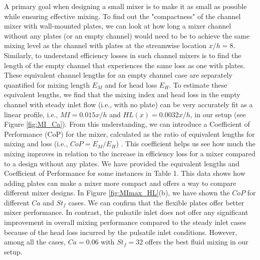 \documentclass[%
 aip,
 amsmath,amssymb,
 reprint,
]{revtex4-1}
\begin{document}
A primary goal when designing a small mixer is to make it as small as possible while ensuring effective mixing. To find out the "compactness" of the channel mixer with wall-mounted plates, we can look at how long a mixer channel without any plates (or an empty channel) would need to be to achieve the same mixing level as the channel with plates at the streamwise location $x/h = 8$. Similarly, to understand efficiency losses in such channel mixers is to find the length of the empty channel that experiences the same loss as one with plates. These equivalent channel lengths for an empty channel case are separately quantified for mixing length $E_M$ and for head loss $E_H$. To estimate these equivalent lengths, we find that the mixing index and head loss in the empty channel with steady inlet flow (i.e., with no plate) can be very accurately fit as a linear profile, i.e., $MI = 0.015x/h$ and $HL(x)=0.0032x/h$, in our setup (see Figure \ref{fig:MI_Ca}). From this understanding, we can introduce a Coefficient of Performance (CoP) for the mixer, calculated as the ratio of equivalent lengths for mixing and loss (i.e., $CoP = E_M/E_H$) \citep{Aaron2019}. This coefficient helps us see how much the mixing improves in relation to the increase in efficiency loss for a mixer compared to a design without any plates. We have provided the equivalent lengths and Coefficient of Performance for some instances in Table 1. This data shows how adding plates can make a mixer more compact and offers a way to compare different mixer designs. In Figure \ref{fig:MImax_HL}(b), we have shown the $CoP$ for different $Ca$ and $St_f$ cases. We can confirm that the flexible plates offer better mixer performance. In contrast, the pulsatile inlet does not offer any significant improvement in overall mixing performance compared to the steady inlet cases because of the head loss incurred by the pulsatile inlet conditions. However, among all the cases, $Ca=0.06$ with $St_f=32$ offers the best fluid mixing in our setup.
\end{document}

